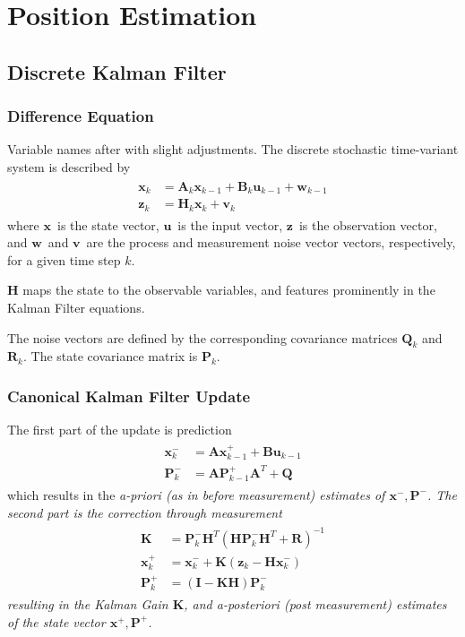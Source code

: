 \documentclass[12pt,a4paper,oneside,openany]{article}
\newcommand{\vx}{\ensuremath{\mathbf{x}}}
\newcommand{\vz}{\ensuremath{\mathbf{z}}}
\newcommand{\vu}{\ensuremath{\mathbf{u}}}
\newcommand{\vv}{\ensuremath{\mathbf{v}}}
\newcommand{\vw}{\ensuremath{\mathbf{w}}}
\newcommand{\mA}{\ensuremath{\mathbf{A}}}
\newcommand{\mB}{\ensuremath{\mathbf{B}}}
\newcommand{\mH}{\ensuremath{\mathbf{H}}}
\newcommand{\mK}{\ensuremath{\mathbf{K}}}
\newcommand{\mP}{\ensuremath{\mathbf{P}}}
\newcommand{\mQ}{\ensuremath{\mathbf{Q}}}
\newcommand{\mR}{\ensuremath{\mathbf{R}}}
\newcommand{\mI}{\ensuremath{\mathbf{I}}}
\begin{document}
\section{Position Estimation}

\subsection{Discrete Kalman Filter}

\subsubsection{Difference Equation}

Variable names after \cite{kalman-tut} with slight adjustments. The discrete stochastic time-variant system is described by
\begin{gather}
\begin{aligned}
\vx_k &= \mA_{k} \vx_{k-1} +  \mB_{k} \vu_{k-1} + \vw_{k-1} \\
\vz_k &= \mH_k \vx_k + \vv_k
\end{aligned}
\end{gather}
where \vx\ is the state vector, \vu\ is the input vector, \vz\ is the observation vector, and \vw\ and \vv\ are the process and measurement noise vector vectors, respectively, for a given time step $k$.

$\mH$ maps the state to the observable variables, and features prominently in the Kalman Filter equations.

The noise vectors are defined by the corresponding covariance matrices $\mQ_k$ and $\mR_k$. The state covariance matrix is $\mP_k$.

\subsubsection{Canonical Kalman Filter Update}

The first part of the update is prediction
\begin{gather}
\begin{aligned}
\vx^-_k &= \mA \vx^+_{k-1} +  \mB \vu_{k-1} \\
\mP^-_k &= \mA\mP^+_{k-1}\mA^T + \mQ
\end{aligned}
\end{gather}
which results in the \em a-priori \em (as in before measurement) estimates of $\vx^-, \mP^-$. The second part is the correction through measurement
\begin{gather}
\begin{aligned}
\mK &= \mP^-_k\mH^T\left( \mH \mP^-_k \mH^T + \mR \right)^{-1}\\
\vx^+_k &= \vx^-_k + \mK \left(\vz_k - \mH\vx^-_k \right)\\
\mP^+_k &= \left( \mI - \mK \mH \right) \mP^-_k
\end{aligned}
\end{gather}
resulting in the \em Kalman Gain \em $\mK$, and \em a-posteriori \em (post measurement) estimates of the state vector $\vx^+, \mP^+$.
\end{document}

